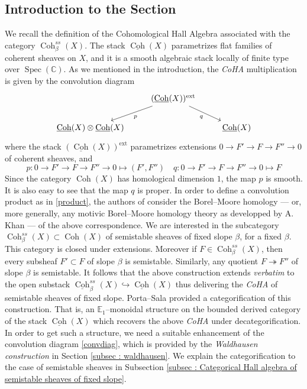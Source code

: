 \documentclass[11pt]{article}
\newcommand{\BC}{\mathbb{C}}
\newcommand{\coh}{\operatorname{Coh}}
\newcommand{\cohbetass}{\operatorname{Coh}^{ss}_{\beta}(X)}
\begin{document}
\subsection{Introduction to the Section}\label{subsec : intro sec 2}

We recall the definition of the Cohomological Hall Algebra associated with the category $\cohbetass$. The stack $\underline{\coh}(X)$ parametrizes flat families of coherent sheaves on $X$, and it is a smooth algebraic stack locally of finite type over $\operatorname{Spec}(\BC)$. As we mentioned in the introduction, the \textit{CoHA} multiplication is given by the convolution diagram
\begin{equation}\label{eqn : coha diagram}
\begin{tikzcd}
	& {(\underline{\coh}(X))^{\operatorname{ext}}} & \\
	{\underline{\coh}(X) \otimes \underline{\coh}(X)} && \underline{\coh}(X)
	\arrow["p", from=1-2, to=2-1]
	\arrow["q"', from=1-2, to=2-3]
\end{tikzcd}
\end{equation}
where the stack ${(\underline{\coh}(X))^{\operatorname{ext}}}$ parametrizes extensions $0\rightarrow F' \rightarrow F \rightarrow F'' \rightarrow 0$ of coherent sheaves, and
\[
    p \colon 0\rightarrow F' \rightarrow F \rightarrow F'' \rightarrow 0 \mapsto (F',F'') \quad q \colon 0\rightarrow F' \rightarrow F \rightarrow F'' \rightarrow 0 \mapsto F
\]
Since the category $\coh(X)$ has homological dimension $1$, the map $p$ is smooth. It is also easy to see that the map $q$ is proper. In order to define a convolution product as in \eqref{product}, the authors of \cite{dps} consider the Borel--Moore homology --- or, more generally, any motivic Borel--Moore homology theory as developped by A. Khan \cite{khan1, khan2019virtualfundamentalclassesderived}  --- of the above correspondence. We are interested in the subcategory $\cohbetass  \subset \coh(X)$ of semistable sheaves of fixed slope $\beta$, for a fixed $\beta$. This category is closed under extensions. Moreover if $F\in \cohbetass$, then every subsheaf $F' \subset F$ of slope $\beta$ is semistable. Similarly, any quotient $F \twoheadrightarrow F''$ of slope $\beta$ is semistable. It follows that the above construction extends \textit{verbatim} to the open substack $\underline{\coh}_{\beta}^{ss}(X) \hookrightarrow \underline{\coh}(X)$
thus delivering the \textit{CoHA} of semistable sheaves of fixed slope. Porta--Sala \cite{Porta2019TwodimensionalCH} provided a categorification of this construction. That is, an $\mathbb{E}_1$--monoidal structure on the bounded derived category of the stack $\underline{\coh}(X)$ which recovers the above \textit{CoHA} under decategorification. In order to get such a structure, we need a suitable enhancement of the convolution diagram \eqref{convdiag}, which is provided by the \textit{Waldhausen construction} in Section \ref{subsec : waldhausen}. We explain the categorification to the case of semistable sheaves in Subsection \ref{subsec : Categorical Hall algebra of semistable sheaves of fixed slope}.
\end{document}
